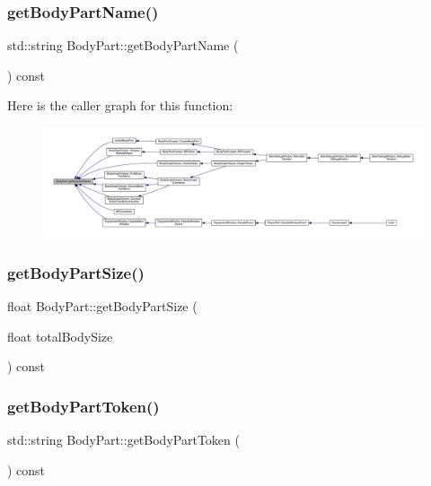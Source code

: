 \subsubsection{\texorpdfstring{get\+Body\+Part\+Name()}{getBodyPartName()}}
{\footnotesize\ttfamily std\+::string Body\+Part\+::get\+Body\+Part\+Name (\begin{DoxyParamCaption}{ }\end{DoxyParamCaption}) const}

Here is the caller graph for this function\+:
\nopagebreak
\begin{figure}[H]
\begin{center}
\leavevmode
\includegraphics[width=350pt]{d2/d6f/class_body_part_af5a68e571235e6b4e8cd6a13ec94bab3_icgraph}
\end{center}
\end{figure}
\mbox{\label{class_body_part_af6ffb527a93262f5f44eb46e0cc406b8}} 
\subsubsection{\texorpdfstring{get\+Body\+Part\+Size()}{getBodyPartSize()}}
{\footnotesize\ttfamily float Body\+Part\+::get\+Body\+Part\+Size (\begin{DoxyParamCaption}\item[{float}]{total\+Body\+Size }\end{DoxyParamCaption}) const}

\mbox{\label{class_body_part_a9768feacb428c5611d0a8f58a0540618}} 
\subsubsection{\texorpdfstring{get\+Body\+Part\+Token()}{getBodyPartToken()}}
{\footnotesize\ttfamily std\+::string Body\+Part\+::get\+Body\+Part\+Token (\begin{DoxyParamCaption}{ }\end{DoxyParamCaption}) const}

